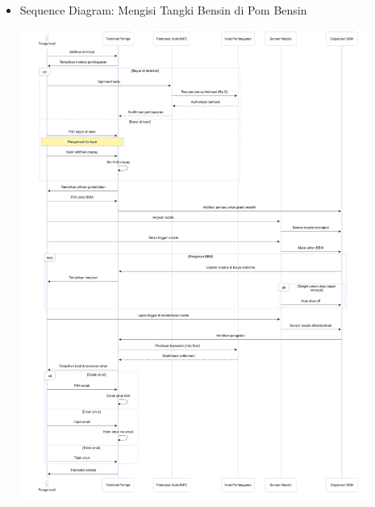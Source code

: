 \documentclass[a4paper]{article}
\begin{document}
\begin{enumerate}[itemsep=1em]
  \begin{itemize}[itemsep=1em]
    \item Sequence Diagram: Mengisi Tangki Bensin di Pom Bensin
    \begin{center}
      \includegraphics[width=0.9\textwidth,keepaspectratio]{fueling-sequence-diagram.png}
    \end{center}
  \end{itemize}

  \pagebreak


\end{enumerate}
\end{document}
